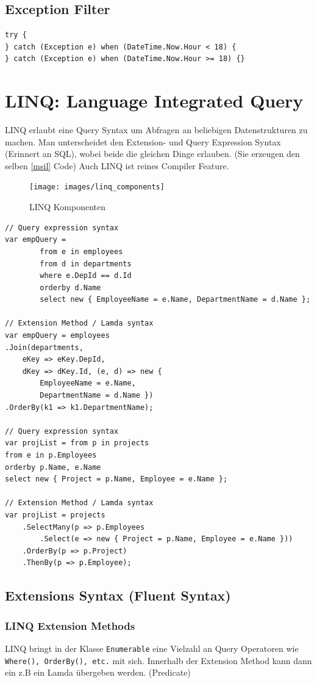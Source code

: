 \subsection{Exception Filter}
\begin{lstlisting}
try {
} catch (Exception e) when (DateTime.Now.Hour < 18) {
} catch (Exception e) when (DateTime.Now.Hour >= 18) {}
\end{lstlisting}


\section{LINQ: Language Integrated Query}
LINQ erlaubt eine Query Syntax um Abfragen an beliebigen Datenstrukturen zu machen. Man unterscheidet den Extension- und Query Expression Syntax (Erinnert an SQL), wobei beide die gleichen Dinge erlauben. (Sie erzeugen den selben \ref{msil} Code) Auch LINQ ist reines Compiler Feature.

\begin{figure}[h]
\centering
\texttt{[image: images/linq\_components]}
\caption{LINQ Komponenten}
\label{fig:linqcomponents}
\end{figure}

\begin{lstlisting}
// Query expression syntax
var empQuery =
        from e in employees
        from d in departments
        where e.DepId == d.Id
        orderby d.Name
        select new { EmployeeName = e.Name, DepartmentName = d.Name };

// Extension Method / Lamda syntax
var empQuery = employees
.Join(departments, 
	eKey => eKey.DepId, 
	dKey => dKey.Id, (e, d) => new { 
		EmployeeName = e.Name, 
		DepartmentName = d.Name })
.OrderBy(k1 => k1.DepartmentName);

// Query expression syntax
var projList = from p in projects
from e in p.Employees
orderby p.Name, e.Name
select new { Project = p.Name, Employee = e.Name };

// Extension Method / Lamda syntax
var projList = projects
    .SelectMany(p => p.Employees
        .Select(e => new { Project = p.Name, Employee = e.Name }))
    .OrderBy(p => p.Project)
    .ThenBy(p => p.Employee);			  
\end{lstlisting}

\subsection{Extensions Syntax (Fluent Syntax)}
\subsubsection{LINQ Extension Methods}
LINQ bringt in der Klasse \lstinline|Enumerable| eine Vielzahl an Query Operatoren wie \lstinline|Where(), OrderBy(), etc.| mit sich. Innerhalb der Extension Method kann dann ein z.B ein Lamda übergeben werden. (Predicate)

